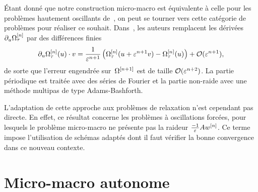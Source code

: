 Étant donné que notre construction micro-macro est équivalente à celle pour les problèmes hautement oscillants de~\cite{chartier.2020.new}, on peut se tourner vers cette catégorie de problèmes pour réaliser ce souhait. Dans~\cite{chartier.2020.derivative}, les auteurs remplacent les dérivées $\partial_u \Omega^{[n]} _\tau$ par des différences finies 
\begin{equation*}
    \partial_u \Omega^{[n]} _\tau (u) \cdot v
    = \frac{1}{\varepsilon^{n+1}} \left( 
        \Omega^{[n]} _\tau (u + \varepsilon^{n+1} v ) - \Omega^{[n]} _\tau (u)
    \right) + \mathcal{O}( \varepsilon^{n+1} ) ,
\end{equation*}
de sorte que l'erreur engendrée sur~$\Omega^{[n+1]}$ est de taille $\mathcal{O}(\varepsilon^{n+2})$. La partie périodique est traitée avec des séries de Fourier et la partie non-raide avec une méthode multipas de type Adams-Bashforth.

L'adaptation de cette approche aux problèmes de relaxation n'est cependant pas directe. En effet, ce résultat concerne les problèmes à oscillations forcées, pour lesquels le problème micro-macro ne présente pas la raideur $\frac{-1}{\varepsilon}A w^{[n]}$. Ce terme impose l'utilisation de schémas adaptés dont il faut vérifier la bonne convergence dans ce nouveau contexte.



\section{Micro-macro autonome}
\label{ext:sec:auto}

